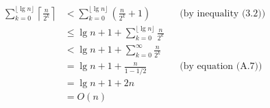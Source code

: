 \liftdisplaystyle
\begin{align*}
	\sum_{k=0}^{\lfloor\lg n\rfloor}\left\lceil\frac{n}{2^k}\right\rceil &< \sum_{k=0}^{\lfloor\lg n\rfloor}\left(\frac{n}{2^k}+1\right) && \text{(by inequality (3.2))} \\
    &\le \lg n+1+\sum_{k=0}^{\lfloor\lg n\rfloor}\frac{n}{2^k} \\
    &< \lg n+1+\sum_{k=0}^\infty\frac{n}{2^k} \\
	&= \lg n+1+\frac{n}{1-1/2} && \text{(by equation (A.7))} \\
    &= \lg n+1+2n \\
    &= O(n)
\end{align*}
